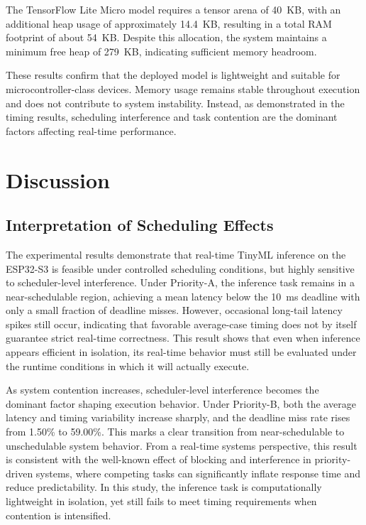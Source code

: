 \documentclass[conference]{IEEEtran}
\begin{document}
The TensorFlow Lite Micro model requires a tensor arena of 40~KB, with an additional heap usage of approximately 14.4~KB, resulting in a total RAM footprint of about 54~KB. Despite this allocation, the system maintains a minimum free heap of 279~KB, indicating sufficient memory headroom.

These results confirm that the deployed model is lightweight and suitable for microcontroller-class devices. Memory usage remains stable throughout execution and does not contribute to system instability. Instead, as demonstrated in the timing results, scheduling interference and task contention are the dominant factors affecting real-time performance.

\section{Discussion}
\label{sec:discussion}

\subsection{Interpretation of Scheduling Effects}
\label{subsec:discussion_scheduling_effects}

The experimental results demonstrate that real-time TinyML inference on the ESP32-S3 is feasible under controlled scheduling conditions, but highly sensitive to scheduler-level interference. Under Priority-A, the inference task remains in a near-schedulable region, achieving a mean latency below the 10~ms deadline with only a small fraction of deadline misses. However, occasional long-tail latency spikes still occur, indicating that favorable average-case timing does not by itself guarantee strict real-time correctness. This result shows that even when inference appears efficient in isolation, its real-time behavior must still be evaluated under the runtime conditions in which it will actually execute.

As system contention increases, scheduler-level interference becomes the dominant factor shaping execution behavior. Under Priority-B, both the average latency and timing variability increase sharply, and the deadline miss rate rises from 1.50\% to 59.00\%. This marks a clear transition from near-schedulable to unschedulable system behavior. From a real-time systems perspective, this result is consistent with the well-known effect of blocking and interference in priority-driven systems, where competing tasks can significantly inflate response time and reduce predictability. In this study, the inference task is computationally lightweight in isolation, yet still fails to meet timing requirements when contention is intensified.
\end{document}
